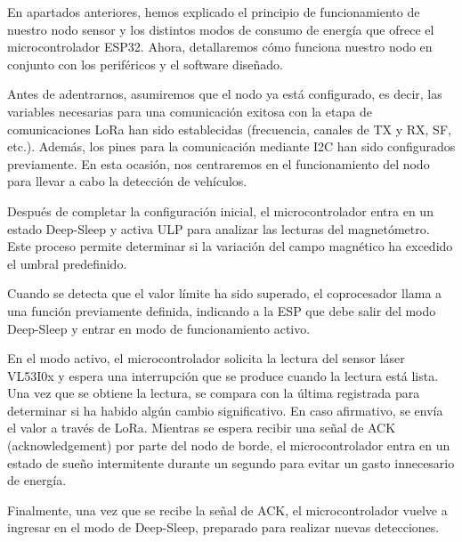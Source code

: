 En apartados anteriores, hemos explicado el principio de funcionamiento de nuestro nodo sensor y los distintos modos de consumo de energía que ofrece el microcontrolador ESP32. Ahora, detallaremos cómo funciona nuestro nodo en conjunto con los periféricos y el software diseñado.

Antes de adentrarnos, asumiremos que el nodo ya está configurado, es decir, las variables necesarias para una comunicación exitosa con la etapa de comunicaciones LoRa han sido establecidas (frecuencia, canales de TX y RX, SF, etc.). Además, los pines para la comunicación mediante I2C han sido configurados previamente. En esta ocasión, nos centraremos en el funcionamiento del nodo para llevar a cabo la detección de vehículos.


Después de completar la configuración inicial, el microcontrolador entra en un estado Deep-Sleep y activa ULP para analizar las lecturas del magnetómetro. Este proceso permite determinar si la variación del campo magnético ha excedido el umbral predefinido.


Cuando se detecta que el valor límite ha sido superado, el coprocesador llama a una función previamente definida, indicando a la ESP que debe salir del modo Deep-Sleep y entrar en modo de funcionamiento activo.

En el modo activo, el microcontrolador solicita la lectura del sensor láser VL53I0x y espera una interrupción que se produce cuando la lectura está lista. Una vez que se obtiene la lectura, se compara con la última registrada para determinar si ha habido algún cambio significativo. En caso afirmativo, se envía el valor a través de LoRa.
Mientras se espera recibir una señal de ACK (acknowledgement) por parte del nodo de borde, el microcontrolador entra en un estado de sueño intermitente durante un segundo para evitar un gasto innecesario de energía.

Finalmente, una vez que se recibe la señal de ACK, el microcontrolador vuelve a ingresar en el modo de Deep-Sleep, preparado para realizar nuevas detecciones.

